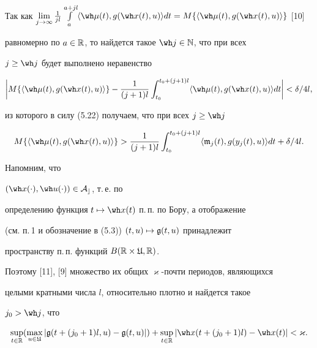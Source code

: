 Так как $\lim\limits_{j\to\infty}


\frac{1}{jl}\int\limits_a^{a+jl}


\langle\wh\mu(t),g(\wh x(t),u)\rangle dt=


M\{\langle\wh\mu(t),g(\wh x(t),u)\rangle\}$ [10]


равномерно по $a\in\Bbb R$, то найдется такое $\wh j\in\Bbb N$, что при всех


$j\ge\wh j$ будет выполнено неравенство


$$


\bigg|M\{\langle\wh\mu(t),g(\wh


x(t),u)\rangle\}-\frac{1}{(j+1)l}\int_{t_0}^{t_0+(j+1)l}


\langle\wh\mu(t),g(\wh


x(t),u)\rangle dt\bigg|<\delta/4l,


$$


из которого в силу (5.22) получаем, что при всех $j\ge\wh j$


\begin{equation}


M\{\langle\wh\mu(t),g(\wh x(t),u)\rangle\}>


\frac{1}{(j+1)l}\int_{t_0}^{t_0+(j+1)l}


\langle\frak m_j(t),g(y_j(t),u)\rangle dt


+\delta/4l.


\end{equation}





Напомним, что


$(\wh x(\cdot),\wh u(\cdot))\in\cal A_c$, т.\,е. по


определению функция $t\mapsto\wh x(t)$ п.\,п. по Бору, а отображение


(см. п.\,1 и обозначение в (5.3)) $(t,u)\mapsto\frak g(t,u)$ принадлежит


пространству п.\,п. функций $B(\Bbb R\times\frak U,\Bbb R)$.


Поэтому [11], [9] множество их общих $\varkappa$-почти периодов, являющихся


целыми кратными числа $l$, относительно плотно и найдется такое


$j_0>\wh j$, что


\begin{equation}


\sup_{t\in\bR}(\max_{u\in\frak U}|\frak g


(t+(j_0+1)l,u)-\frak g(t,u)|)+


\sup_{t\in\bR}|\wh x(t+(j_0+1)l)-\wh x(t)|<\varkappa.


\end{equation}





